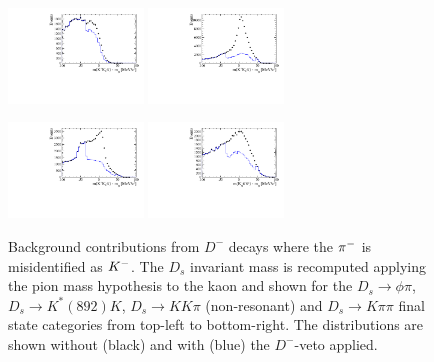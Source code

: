 \begin{figure}[h]
\centering
\includegraphics[height=!,width=0.32\textwidth]{figs/BkgStudies/norm_Ds2KKpi_as_D2Kpipi_compareVeto_0.pdf} 
\includegraphics[height=!,width=0.32\textwidth]{figs/BkgStudies/norm_Ds2KKpi_as_D2Kpipi_compareVeto_1.pdf}

\includegraphics[height=!,width=0.32\textwidth]{figs/BkgStudies/norm_Ds2KKpi_as_D2Kpipi_compareVeto_2.pdf} 
\includegraphics[height=!,width=0.32\textwidth]{figs/BkgStudies/norm_Ds2Kpipi_as_D2pipipi_compareVeto.pdf}
\caption{
Background contributions from $D^-$ decays where the ${{\pi}^-}$ is misidentified as ${{K}^-}$. 
The $D_s$ invariant mass is recomputed applying the pion mass hypothesis to the kaon and shown for the 
$D_s \to \phi \pi$, $D_s \to K^*(892)K$, $D_s \to KK\pi$ (non-resonant) and $D_s \to K\pi\pi$ final state categories
from top-left to bottom-right.
The distributions are shown without (black) and with (blue) the $D^-$-veto applied. 
}
\label{fig:vetoD}
\end{figure}
%
